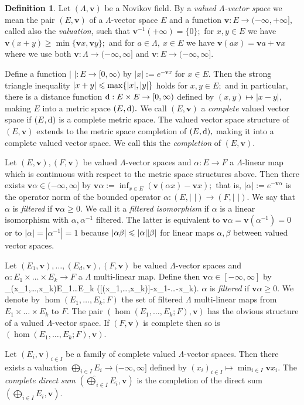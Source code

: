 \documentclass{article}
\theoremstyle{plain}%
\theoremstyle{definition}
\newtheorem{dfn}[thm]{Definition}
\numberwithin{equation}{section}
\numberwithin{figure}{section}
\def\wh{\widehat}
\def\e#1\e{\begin{equation}#1\end{equation}}
\def\l{\label}
\def\ge{\geqslant}
\def\le{\leqslant\nobreak}
\def\al{\alpha}
\def\be{\beta}
\def\La{\Lambda}
\def\ts{\textstyle}
\def\bop{\bigoplus}
\def\iy{\infty}
\def\v{{\mathbf{v}}}\def\cl{{\rm cl}}\def\alg{{\rm alg}}\def\geom{{\rm geom}}\def\loc{{\rm loc}}\def\dirlim{\displaystyle\varinjlim}
\begin{document}
\begin{dfn}\l{dfn: val vect}
Let $(\La,\v)$ be a Novikov field. By a {\it valued $\La$-vector space} we mean the pair $(E,\v)$ of a $\La$-vector space $E$ and a function $\v:E\to(-\iy,+\iy],$ called also the {\it valuation,} such that
$\v^{-1}(+\iy)=\{0\};$ for $x,y\in E$ we have $\v(x+y) \ge \min\{\v x,\v y\};$ and 
for $a\in\La,\ x\in E$ we have $\v(a x)=\v a+\v x$ where we use both $\v:\La\to(-\iy,\iy]$ and $\v:E\to(-\iy,\iy].$

Define a function $|\,\,|:E\to[0,\iy)$ by $|x|:=e^{-\v x}$ for $x\in E.$ Then the strong triangle inequality $|x+y|\le\max\{|x|,|y|\}$ holds for $x,y \in E;$ and in particular, there is a distance function ${\rm d}:E\times E\to[0,\iy)$ defined by $(x,y)\mapsto|x-y|,$ making $E$ into a metric space $(E,{\rm d}).$
We call $(E,\v)$ a {\it complete} valued vector space if $(E,{\rm d})$ is a complete metric space.
The valued vector space structure of $(E,\v)$ extends to the metric space completion of $(E,{\rm d}),$ making it into a complete valued vector space. We call this the {\it completion} of $(E,\v).$

Let $(E,\v),(F,\v)$ be valued $\La$-vector spaces and $\al:E\to F$ a $\La$-linear map which is continuous with respect to the metric space structures above.
Then there exists $\v\al\in(-\iy,\iy]$ by $\v\al:=\inf_{x\in E} (\v (\al x)-\v x);$ that is, $|\al|:=e^{-\v\al}$ is the operator norm of the bounded operator $\al:(E,|\,\,|)\to(F,|\,\,|).$
We say that $\al$ is {\it filtered} if $\v\al\ge0.$
We call it a {\it filtered isomorphism} if $\al$ is a linear isomorphism with $\al,\al^{-1}$ filtered. The latter is equivalent to $\v\al=\v(\al^{-1})=0$ or to $|\al|=|\al^{-1}|=1$ because $|\al\be|\le|\al||\be|$ for linear maps $\al,\be$ between valued vector spaces. 

Let $(E_1,\v),\dots,(E_d,\v),(F,\v)$ be valued $\La$-vector spaces and $\al:E_1\times\dots\times E_k\to F$ a $\La$ multi-linear map.
Define then $\v\al\in[-\iy,\iy]$ by
\e \v\al:=\ts\inf_{(x_1,\dots,x_k)\in E_1\times\dots\times E_k} (\v[\al (x_1,\dots,x_k)]-\v x_1-\dots-\v x_k).\e
We say that $\al$ is {\it filtered} if $\v\al\ge0.$
We denote by $\hom(E_1,\dots,E_k;F)$ the set of filtered $\La$ multi-linear maps from $E_1\times\dots\times E_k$ to $F.$
The pair $(\hom(E_1,\dots,E_k;F),\v)$ has the obvious structure of a valued $\La$-vector space.
If $(F,\v)$ is complete then so is $(\hom(E_1,\dots,E_k;F),\v).$

Let $(E_i,\v)_{i\in I}$ be a family of complete valued $\La$-vector spaces. Then there exists a valuation $\bigoplus_{i\in I} E_i\to(-\iy,\iy]$ defined by $(x_i)_{i\in I}\mapsto \min_{i\in I}\v x_i.$
The {\it complete direct sum} $(\wh\bigoplus_{i\in I}E_i,\v)$ is the completion of the direct sum $(\bop_{i\in I}E_i,\v).$
\end{dfn}
\end{document}

